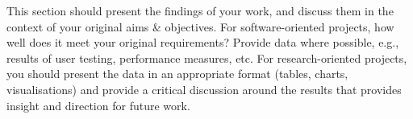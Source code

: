 This section should present the findings of your work, and discuss them in the context of your original aims & objectives.  For software-oriented projects, how well does it meet your original requirements? Provide data where possible, e.g., results of user testing, performance measures, etc. For research-oriented projects, you should present the data in an appropriate format (tables, charts, visualisations) and provide a critical discussion around the results that provides insight and direction for future work.